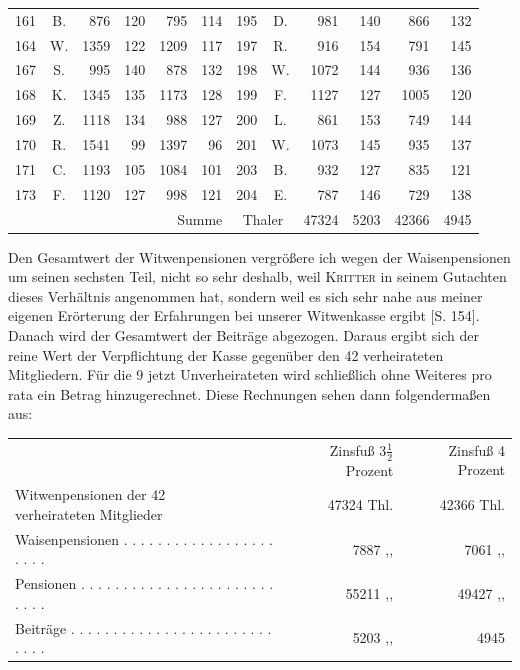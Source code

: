 \begin{center}
\begin{tabular}{r|c|r|r|r|r||r|c|r|r|r|r}
161&B.&876&120&795&114&195&D.&981&140&866&132\\
164&W.&1359&122&1209&117&197&R.&916&154&791&145\\
167&S.&995&140&878&132&198&W.&1072&144&936&136\\
168&K.&1345&135&1173&128&199&F.&1127&127&1005&120\\
169&Z.&1118&134&988&127&200&L.&861&153&749&144\\
170&R.&1541&99&1397&96&201&W.&1073&145&935&137\\
171&C.&1193&105&1084&101&203&B.&932&127&835&121\\
173&F.&1120&127&998&121&204&E.&787&146&729&138\\\cline{6-12}
\multicolumn{6}{r}{Summe}&\multicolumn{2}{c|}{Thaler}&47324&5203&42366&4945
\end{tabular}
\end{center}
\noindent\hspace*{\parindent}Den Gesamtwert der Witwenpensionen vergrößere ich wegen der Waisenpensionen um seinen sechsten Teil, nicht so sehr deshalb, weil \textsc{Kritter} in seinem Gutachten dieses Verhältnis angenommen hat, sondern weil es sich sehr nahe aus meiner eigenen Erörterung der Erfahrungen bei unserer Witwenkasse ergibt [S. 154]. Danach wird der Gesamtwert der Beiträge abgezogen. Daraus ergibt sich der reine Wert der Verpflichtung der Kasse gegenüber den 42 verheirateten Mitgliedern. Für die 9 jetzt Unverheirateten wird schließlich ohne Weiteres pro rata ein Betrag hinzugerechnet. Diese Rechnungen sehen dann folgendermaßen aus:
\begin{center}
\footnotesize\setlength{\tabcolsep}{3pt}
\begin{tabular}{l r|r}
&Zinsfuß \(3\tfrac{1}{2}\) Prozent&Zinsfuß 4 Prozent\\
\shortstack[l]{Witwenpensionen der 42\\verheirateten Mitglieder}&47324 Thl.&42366 Thl.\\
Waisenpensionen . . . . . . . . . . . . . . . . . . . . . .&7887 ,, &7061 ,, \\[5pt]
Pensionen . . . . . . . . . . . . . . . . . . . . . . . . . . .&55211 ,, &49427 ,, \\
Beiträge . . . . . . . . . . . . . . . . . . . . . . . . . . . .&5203 ,, &4945
\end{tabular}
\end{center}

